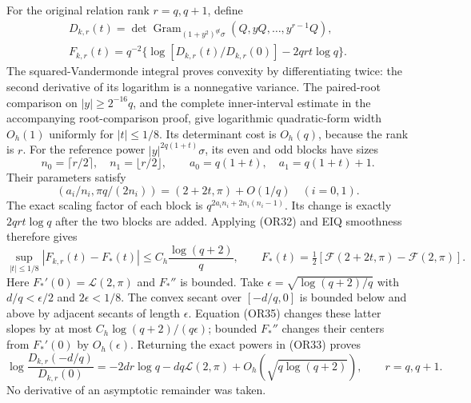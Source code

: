 For the original relation rank \(r=q,q+1\), define
\[
\begin{gathered}
 D_{k,r}(t)=\det\operatorname{Gram}_{(1+y^2)^{qt}\sigma}
                                     (Q,yQ,\ldots,y^{r-1}Q),\\
 F_{k,r}(t)=q^{-2}\{\log[D_{k,r}(t)/D_{k,r}(0)]
                                             -2qrt\log q\}.\end{gathered} \tag{OR33}
\]
The squared-Vandermonde integral proves convexity by
differentiating twice: the second derivative of its logarithm
is a nonnegative variance.  The paired-root comparison on
\(|y|\geq2^{-16}q\), and the complete inner-interval estimate
in the accompanying root-comparison proof, give logarithmic
quadratic-form width \(O_h(1)\) uniformly for \(|t|\leq1/8\).
Its determinant cost is \(O_h(q)\), because the rank is \(r\).
For the reference power \(|y|^{2q(1+t)}\sigma\), its even and
odd blocks have sizes
\[
 n_0=\lceil r/2\rceil,\quad n_1=\lfloor r/2\rfloor,
 \qquad a_0=q(1+t),\quad a_1=q(1+t)+1.
\]
Their parameters satisfy
\[
 (a_i/n_i,\pi q/(2n_i))=(2+2t,\pi)+O(1/q)
 \quad(i=0,1).
 \tag{OR34}
\]
The exact scaling factor of each block is
\(q^{2a_i n_i+2n_i(n_i-1)}\).
Its change is exactly \(2qrt\log q\) after the two blocks
are added.  Applying (OR32) and EIQ smoothness therefore gives
\[
 \sup_{|t|\leq1/8}|F_{k,r}(t)-F_*(t)|
 \leq C_h\frac{\log(q+2)}q,\qquad
 F_*(t)=\tfrac12[\mathcal F(2+2t,\pi)-\mathcal F(2,\pi)] .
 \tag{OR35}
\]
Here \(F_*'(0)=\mathcal L(2,\pi)\) and \(F_*''\) is bounded.
Take \(\epsilon=\sqrt{\log(q+2)/q}\) with
\(d/q<\epsilon/2\) and \(2\epsilon<1/8\).
The convex secant over \([-d/q,0]\) is bounded below and
above by adjacent secants of length \(\epsilon\).
Equation (OR35) changes these latter slopes by at most
\(C_h\log(q+2)/(q\epsilon)\); bounded \(F_*''\) changes their
centers from \(F_*'(0)\) by \(O_h(\epsilon)\).
Returning the exact powers in (OR33) proves
\[
 \log\frac{D_{k,r}(-d/q)}{D_{k,r}(0)}
 =-2dr\log q-dq\mathcal L(2,\pi)
   +O_h(\sqrt{q\log(q+2)}),\qquad r=q,q+1.            \tag{OR36}
\]
No derivative of an asymptotic remainder was taken.

